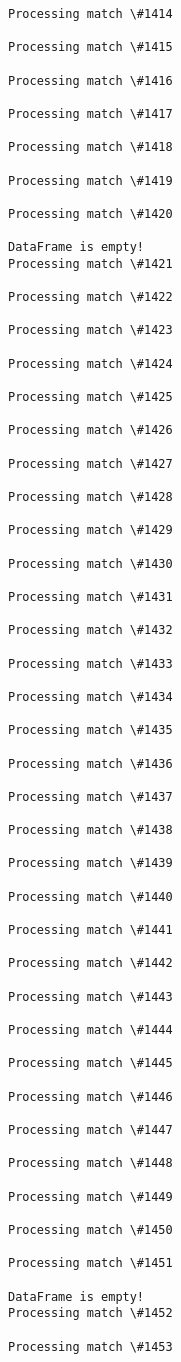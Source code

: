 \documentclass[11pt]{article}
\begin{document}
\begin{Verbatim}[commandchars=\\\{\}]
Processing match \#1414

Processing match \#1415

Processing match \#1416

Processing match \#1417

Processing match \#1418

Processing match \#1419

Processing match \#1420

DataFrame is empty!
Processing match \#1421

Processing match \#1422

Processing match \#1423

Processing match \#1424

Processing match \#1425

Processing match \#1426

Processing match \#1427

Processing match \#1428

Processing match \#1429

Processing match \#1430

Processing match \#1431

Processing match \#1432

Processing match \#1433

Processing match \#1434

Processing match \#1435

Processing match \#1436

Processing match \#1437

Processing match \#1438

Processing match \#1439

Processing match \#1440

Processing match \#1441

Processing match \#1442

Processing match \#1443

Processing match \#1444

Processing match \#1445

Processing match \#1446

Processing match \#1447

Processing match \#1448

Processing match \#1449

Processing match \#1450

Processing match \#1451

DataFrame is empty!
Processing match \#1452

Processing match \#1453


\end{Verbatim}
\end{document}
